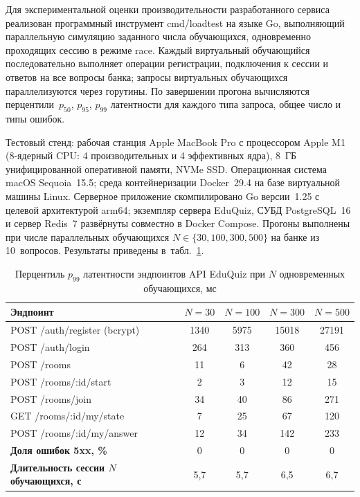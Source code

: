 Для экспериментальной оценки производительности разработанного
сервиса реализован программный инструмент cmd/loadtest
на языке Go, выполняющий параллельную симуляцию заданного числа
обучающихся, одновременно проходящих сессию в режиме race.
Каждый виртуальный обучающийся последовательно выполняет операции
регистрации, подключения к сессии и ответов на все вопросы банка;
запросы виртуальных обучающихся параллелизуются через горутины.
По завершении прогона вычисляются перцентили~$p_{50}$, $p_{95}$,
$p_{99}$ латентности для каждого типа запроса, общее число
и типы ошибок.

Тестовый стенд: рабочая станция Apple MacBook Pro с процессором
Apple M1 (8-ядерный CPU: 4 производительных и 4 эффективных ядра),
8~ГБ унифицированной оперативной памяти, NVMe SSD. Операционная
система macOS Sequoia~15.5; среда контейнеризации Docker~29.4
на базе виртуальной машины Linux. Серверное приложение
скомпилировано Go версии~1.25 с целевой архитектурой arm64;
экземпляр сервера
EduQuiz, СУБД PostgreSQL~16 и сервер Redis~7 развёрнуты совместно
в Docker Compose. Прогоны выполнены при числе параллельных
обучающихся $N \in \{30, 100, 300, 500\}$ на банке из 10~вопросов.
Результаты приведены в~табл.~\ref{tab:loadtest-results}.

\begin{table}[!htb]
\fontsize{11pt}{13pt}\selectfont
\centering
\caption{Перцентиль $p_{99}$ латентности эндпоинтов API EduQuiz
при $N$ одновременных обучающихся, мс}
\label{tab:loadtest-results}
\smallskip
\begin{tabular}{|l|c|c|c|c|}
    \hline
    \textbf{Эндпоинт} & $N=30$ & $N=100$ & $N=300$ & $N=500$ \\
    \hline
        POST /auth/register (bcrypt) & 1340 & 5975 & 15018 & 27191 \\
    \hline
        POST /auth/login             &  264 &  313 &   360 &   456 \\
    \hline
        POST /rooms                  &   11 &    6 &    42 &    28 \\
    \hline
        POST /rooms/:id/start        &    2 &    3 &    12 &    15 \\
    \hline
        POST /rooms/join             &   34 &   40 &    86 &   271 \\
    \hline
        GET /rooms/:id/my/state      &    7 &   25 &    67 &   120 \\
    \hline
        POST /rooms/:id/my/answer    &   12 &   34 &   142 &   233 \\
    \hline
        \textbf{Доля ошибок 5xx, \%}          & 0    & 0    & 0     & 0 \\
    \hline
        \textbf{Длительность сессии $N$ обучающихся, с} & 5{,}7 & 5{,}7 & 6{,}5 & 6{,}7 \\
    \hline
\end{tabular}
\end{table}

